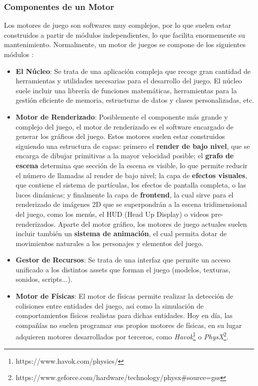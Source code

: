 \subsubsection{Componentes de un Motor}
Los motores de juego son softwares muy complejos, por lo que suelen estar construidos a partir de módulos independientes, lo que facilita enormemente su mantenimiento. Normalmente, un motor de juegos se compone de los siguientes módulos \cite{game_engine_architecture}:
\begin{itemize}
\item\textbf{El Núcleo}: Se trata de una aplicación compleja que recoge gran cantidad de herramientas y utilidades necesarias para el desarrollo del juego. El núcleo suele incluir una librería de funciones matemáticas, herramientas para la gestión eficiente de memoria, estructuras de datos y clases personalizadas, etc.
\item\textbf{Motor de Renderizado}: Posiblemente el componente más grande y complejo del juego, el motor de renderizado es el software encargado de generar los gráficos del juego. Estos motores suelen estar construidos siguiendo una estructura de capas: primero el \textbf{render de bajo nivel}, que se encarga de dibujar primitivas a la mayor velocidad posible; el \textbf{grafo de escena} determina que sección de la escena es visible, lo que permite reducir el número de llamadas al render de bajo nivel; la capa de \textbf{efectos visuales}, que contiene el sistema de partículas, los efectos de pantalla completa, o las luces dinámicas; y finalmente la capa de \textbf{frontend}, la cual sirve para el renderizado de imágenes 2D que se superpondrán a la escena tridimensional del juego, como los menús, el HUD (Head Up Display) o videos pre-renderizados. Aparte del motor gráfico, los motores de juego actuales suelen incluir también un \textbf{sistema de animación}, el cual permita dotar de movimientos naturales a los personajes y elementos del juego. 
\item\textbf{Gestor de Recursos}: Se trata de una interfaz que permite un acceso unificado a los distintos assets que forman el juego (modelos, texturas, sonidos, scripts...). 
\item\textbf{Motor de Físicas}: El motor de físicas permite realizar la detección de colisiones entre entidades del juego, así como la simulación de comportamientos físicos realistas para dichas entidades. Hoy en día, las compañías no suelen programar sus propios motores de físicas, en su lugar adquieren motores desarrollados por terceros, como \textit{Havok}\footnote{https://www.havok.com/physics/} o \textit{PhysX}\footnote{https://www.geforce.com/hardware/technology/physx\#source=gss}.

\end{itemize}
